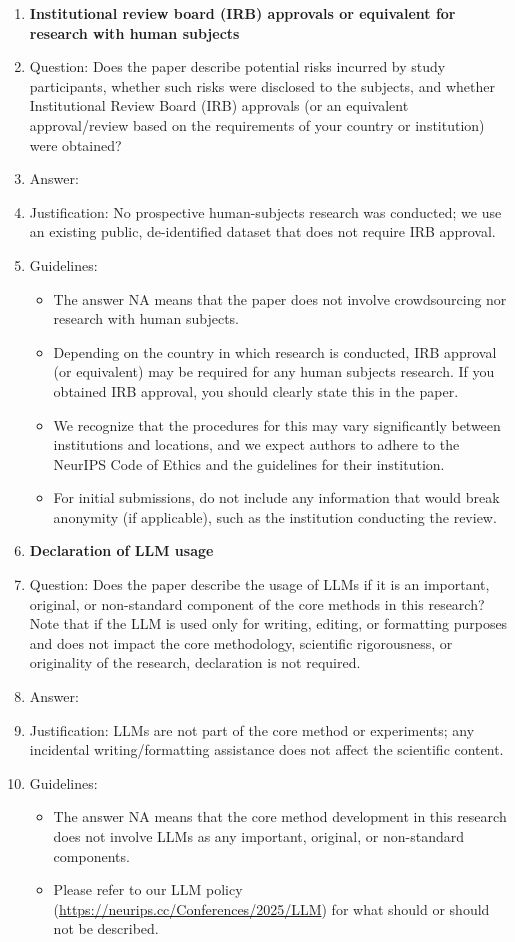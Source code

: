 \documentclass{article}
\begin{document}
\begin{enumerate}
\item {\bf Institutional review board (IRB) approvals or equivalent for research with human subjects}
    \item[] Question: Does the paper describe potential risks incurred by study participants, whether such risks were disclosed to the subjects, and whether Institutional Review Board (IRB) approvals (or an equivalent approval/review based on the requirements of your country or institution) were obtained?
    \item[] Answer: \answerNA{}
    \item[] Justification: No prospective human-subjects research was conducted; we use an existing public, de-identified dataset that does not require IRB approval.
    \item[] Guidelines:
    \begin{itemize}
        \item The answer NA means that the paper does not involve crowdsourcing nor research with human subjects.
        \item Depending on the country in which research is conducted, IRB approval (or equivalent) may be required for any human subjects research. If you obtained IRB approval, you should clearly state this in the paper. 
        \item We recognize that the procedures for this may vary significantly between institutions and locations, and we expect authors to adhere to the NeurIPS Code of Ethics and the guidelines for their institution. 
        \item For initial submissions, do not include any information that would break anonymity (if applicable), such as the institution conducting the review.
    \end{itemize}

\item {\bf Declaration of LLM usage}
    \item[] Question: Does the paper describe the usage of LLMs if it is an important, original, or non-standard component of the core methods in this research? Note that if the LLM is used only for writing, editing, or formatting purposes and does not impact the core methodology, scientific rigorousness, or originality of the research, declaration is not required.
    \item[] Answer: \answerNA{}
    \item[] Justification: LLMs are not part of the core method or experiments; any incidental writing/formatting assistance does not affect the scientific content.
    \item[] Guidelines:
    \begin{itemize}
        \item The answer NA means that the core method development in this research does not involve LLMs as any important, original, or non-standard components.
        \item Please refer to our LLM policy (\url{https://neurips.cc/Conferences/2025/LLM}) for what should or should not be described.
    \end{itemize}

\end{enumerate}
\end{document}
